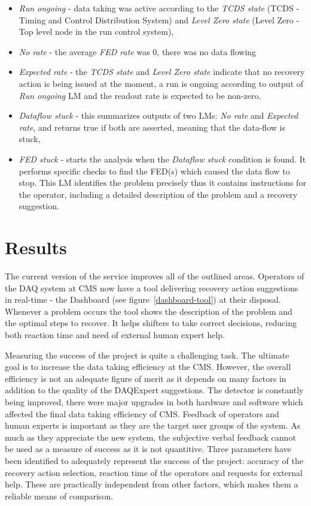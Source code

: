 \documentclass[a4paper]{jpconf}
\begin{document}
\begin{itemize}
\item {\it Run ongoing} -  data taking was active according to the {\it TCDS state} (TCDS - Timing and Control Distribution System) and{ \it Level Zero state} (Level Zero - Top level node in the run control system),
\item{\it No rate} - the average {\it FED rate} was 0, there was no data flowing
\item{\it Expected rate} - the {\it TCDS state}  and {\it Level Zero state} indicate that no recovery action is being issued at the moment, a run is ongoing according to output of {\it Run ongoing} LM and the readout rate is expected to be non-zero.
\item {\it Dataflow stuck} - this summarizes outputs of two LMs: {\it No rate} and {\it Expected rate}, and returns true if both are asserted, meaning that the data-flow is stuck,
\item {\it FED stuck} - starts the analysis when the {\it Dataflow stuck} condition is found. It performs specific checks to find the FED(s) which caused the data flow to stop. This LM identifies the problem precisely thus it contains instructions for the operator, including a detailed description of the problem and a recovery suggestion.
\end{itemize}



\section{Results}

The current version of the service improves all of the outlined areas. Operators of the DAQ system at CMS now have a tool delivering recovery action suggestions in real-time - the Dashboard (see figure~\ref{dashboard-tool}) at their disposal. Whenever a problem occurs the tool shows the description of the problem and the optimal steps to recover. It helps shifters to take correct decisions, reducing both reaction time and need of external human expert help.

Measuring the success of the project is quite a challenging task. The ultimate goal is to increase the data taking efficiency at the CMS. However, the overall efficiency is not an adequate figure of merit as it depends on many factors in addition to the quality of the DAQExpert suggestions. The detector is constantly being improved, there were major upgrades in both hardware and software which affected the final data taking efficiency of CMS. Feedback of operators and human experts is important as they are the target user groups of the system. As much as they appreciate the new system, the subjective verbal feedback cannot be used as a measure of success as it is not quantitive. Three parameters have been identified to adequately represent the success of the project: accuracy of the recovery action selection, reaction time of the operators and requests for external help. These are practically independent from other factors, which makes them a reliable means of comparison.
\end{document}
